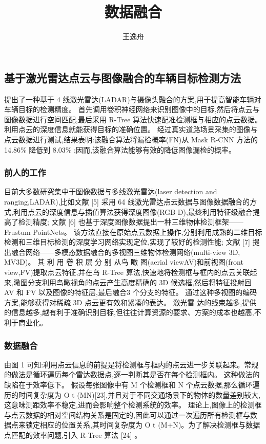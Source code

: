 \documentclass{amsart}
\title{数据融合}
\author{王逸舟}
\begin{document}
\maketitle
\tableofcontents
\subsection{基于激光雷达点云与图像融合的车辆目标检测方法}
\cite{胡远志}提出了一种基于 4 线激光雷达(LADAR)与摄像头融合的方案,用于提高智能车辆对车辆目标的检测精度。
首先调用卷积神经网络来识别图像中的目标,然后将点云与图像数据进行空间匹配,最后采用 R-Tree 算法快速配准检测框与相应的点云数据。
利用点云的深度信息就能获得目标的准确位置。
经过真实道路场景采集的图像与点云数据进行测试,结果表明:该融合算法将漏检概率(FN)从 Mask R-CNN 方法的 14.86\% 降低到 8.03\% ;因而,该融合算法能够有效的降低图像漏检的概率。

\subsubsection{前人的工作}
目前大多数研究集中于图像数据与多线激光雷达(laser detection and ranging,LADAR),比如文献 [5] 采用 64 线激光雷达点云数据与图像数据融合的方式,利用点云的深度信息与插值算法获得深度图像(RGB-D),最终利用特征级融合提高了检测精度;
文献 [6] 也基于深度图像数据提出一种三维物体检测框架——Frustum PointNets。
该方法直接在原始点云数据上操作,分别利用成熟的二维目标检测和三维目标检测的深度学习网络实现定位,实现了较好的检测性能;
文献 [7] 提出融合网络——多模态数据融合的多视图三维物体检测网络(multi-view 3D, MV3D)。 其 利 用 卷 积 层 分 别 从鸟 瞰 图(aerial viewAV)和前视图(front view,FV)提取点云特征,并在鸟 R-Tree 算法,快速地将检测框与框内的点云关联起来,瞰图分支利用鸟瞰视角的点云产生高度精确的 3D 候选框,然后将特征投射回 AV 和 FV 以及图像的特征层,最后融合3 个分支的特征。
通过这种多视图的编码方案,能够获得对稀疏 3D 点云更有效和紧凑的表达。
激光雷 达的线束越多,提供的信息越多,越有利于准确识别目标,但往往计算资源的要求、方案的成本也越高,不利于商业化。
\subsubsection{数据融合}
由图 1 可知:利用点云信息的前提是将检测框与框内的点云进一步关联起来。常规的做法是循环遍历每个雷达数据点,逐一判断其是否在每个检测框内。
这种做法的缺陷在于效率低下。
假设每张图像中有 M 个检测框和 N 个点云数据,那么循环遍历的时间复杂度为 O t (MN)[23],并且对于不同交通场景下的物体的数量差别较大,这意味测距效率不稳定,进而会影响整个检测系统的效率。
理论上,图像上的检测框与点云数据的相对空间结构关系是固定的,因此可以通过一次遍历所有检测框与数据点来锁定相应的位置关系,其时间复杂度为 O t (M+N)。为了解决检测框与数据点匹配的效率问题,引入 R-Tree 算法 [24] 。
\end{document}
